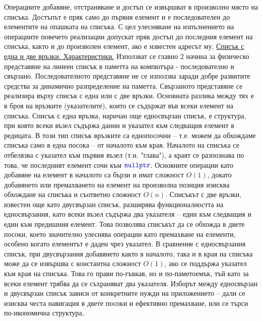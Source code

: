 \documentclass{article}
\begin{document}
Операциите добавяне, отстраняване и достъп се извършват в произволно място на списъка. Достъпът е пряк само до първия елемент и е
последователен до елементите на опашката на списъка. С цел улесняване на изпълнението на операциите повечето реализации допускат пряк
достъп до последния елемент на списъка, както и до произволен елемент, ако е известен адресът му. \newline\newline
\underline{Списък с една и две връзки. Характеристики.} \newline\newline
Използват се главно 2 начина за физическо представяне на линеен списък в паметта на компютъра - последователно и свързано.
Последователното представяне не се използва заради добре развитите средства за динамично разпределение на паметта. Свързаното
представяне се реализира върху списък с една или с две връзки. Основната разлика между тях е в броя на връзките (указателите), които се
съдържат във всеки елемент на списъка. \newline\newline
Списък с една връзка, наричан още едносвързан списък, е структура, при която всеки възел съдържа данни и указател към следващия елемент
в редицата. В този тип списък връзките са еднопосочни – т.е. можем да обхождаме списъка само в една посока – от началото към края. Началото
на списъка се отбелязва с указател към първия възел (т.н. "глава"), а краят се разпознава по това, че последният елемент сочи към $\textcolor{blue}{\texttt{nullptr}}$.
Основните операции като добавяне на елемент в началото са бързи и имат сложност $O(1)$, докато добавянето или премахването на елемент на произволна
позиция изисква обхождане на списъка и съответно сложност $O(n)$. \newline
Списъкът с две връзки, известен още като двусвързан списък, разширява функционалността на едносвързания, като всеки възел съдържа два указателя –
един към следващия и един към предишния елемент. Това позволява списъкът да се обхожда в двете посоки, което значително улеснява операции като
премахване на елементи, особено когато елементът е даден чрез указател. В сравнение с едносвързания списък, при двусвързания добавянето както в
началото, така и в края на списъка може да се извършва с константна сложност $O(1)$, ако се поддържа указател към края на списъка. Това го прави
по-гъвкав, но и по-паметоемък, тъй като за всеки елемент трябва да се съхраняват два указателя. Изборът между едносвързан и двусвързан списък зависи
от конкретните нужди на приложението – дали се изисква честа навигация в двете посоки и ефективно премахване, или се търси по-икономична структура,
\end{document}
